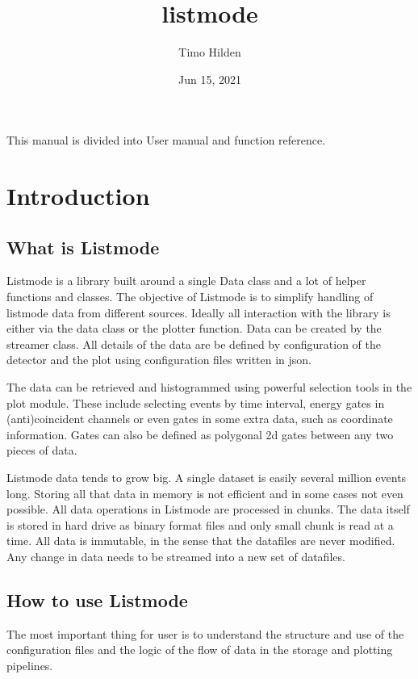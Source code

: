 \documentclass[letterpaper,10pt,english]{sphinxmanual}
\title{listmode}
\date{Jun 15, 2021}
\author{Timo Hilden}
\begin{document}
\pagestyle{empty}
\sphinxmaketitle
\pagestyle{plain}
\sphinxtableofcontents
\pagestyle{normal}
\label{\detokenize{index::doc}}


\sphinxAtStartPar
This manual is divided into User manual and function reference.


\chapter{Introduction}
\label{\detokenize{manual/manual:introduction}}\label{\detokenize{manual/manual::doc}}

\section{What is Listmode}
\label{\detokenize{manual/manual:what-is-listmode}}
\sphinxAtStartPar
Listmode is a library built around a single Data class and a lot of helper functions and classes.
The objective of Listmode is to simplify handling of listmode data from different sources. Ideally
all interaction with the library is either via the data class or the plotter function. Data can be
created by the streamer class. All details of the data are be defined by configuration of the
detector and the plot using configuration files written in json.

\sphinxAtStartPar
The data can be retrieved and histogrammed using powerful selection tools in the plot module.
These include selecting events by time interval, energy gates in (anti)coincident channels or
even gates in some extra data, such as coordinate information. Gates can also be defined as
polygonal 2d gates between any two pieces of data.

\sphinxAtStartPar
Listmode data tends to grow big. A single dataset is easily several million events long. Storing
all that data in memory is not efficient and in some cases not even possible. All data
operations in Listmode are processed in chunks. The data itself is stored in hard drive as
binary format files and only small chunk is read at a time. All data is immutable, in the sense
that the datafiles are never modified. Any change in data needs to be streamed into a new set of
datafiles.


\section{How to use Listmode}
\label{\detokenize{manual/manual:how-to-use-listmode}}
\sphinxAtStartPar
The most important thing for user is to understand the structure and use of the configuration
files and the logic of the flow of data in the storage and plotting pipelines.
\end{document}
